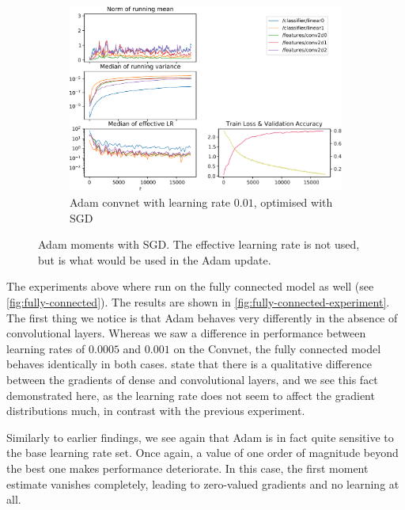 \begin{figure}
    \begin{subfigure}{\textwidth}
        \centering
        \includegraphics[width=\linewidth]{gfx/diagrams/experiments/adam/adammodel_sgd_001_0_-1.pdf}
        \caption{Adam convnet with learning rate $0.01$, optimised with SGD}
        \label{fig:adammodel-3}
    \end{subfigure}
    \label{fig:adammodel-sgd}
    \caption[Adam moments with SGD]{Adam moments with SGD. The effective learning rate is not used, but
    is what would be used in the Adam update.}
\end{figure}

The experiments above where run on the fully connected model as well (see
\cref{fig:fully-connected}). The results are shown in
\cref{fig:fully-connected-experiment}. The first thing we notice is that Adam
behaves very differently in the absence of convolutional layers. Whereas we saw
a difference in performance between learning rates of $0.0005$ and $0.001$ on
the Convnet, the fully connected model behaves identically in both cases.
\citeauthor{kingma2014adam} state that there is a qualitative difference between
the gradients of dense and convolutional layers, and we see this fact
demonstrated here, as the learning rate does not seem to affect the gradient
distributions much, in contrast with the previous experiment.

Similarly to earlier findings, we see again that Adam is in fact quite sensitive
to the base learning rate set. Once again, a value of one order of magnitude
beyond the best one makes performance deteriorate. In this case, the first
moment estimate vanishes completely, leading to zero-valued gradients and no
learning at all.

